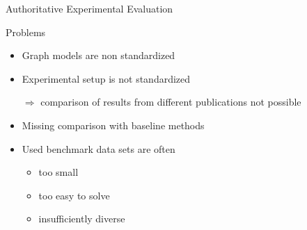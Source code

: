 \documentclass[utf8, xcolor=dvipsnames,ngerman]{beamer}
\begin{document}
\begin{frame}{Authoritative Experimental Evaluation}

\begin{block}{Problems}
 \begin{itemize}
  \item Graph models are non standardized 
  \item Experimental setup is not standardized
  \item[$\Rightarrow$] comparison of results from different publications not possible
  \item Missing comparison with baseline methods
  \item Used benchmark data sets are often 
  \begin{itemize}
    \item too small
    \item too easy to solve 
    \item insufficiently diverse
  \end{itemize}
 \end{itemize}
\end{block}
 
\end{frame}
\end{document}
